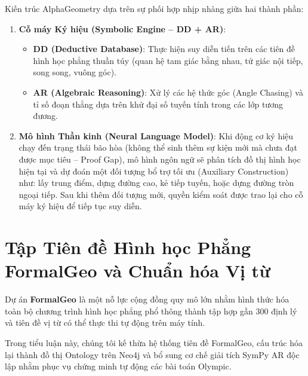 Kiến trúc AlphaGeometry dựa trên sự phối hợp nhịp nhàng giữa hai thành phần:
\begin{enumerate}
    \item \textbf{Cỗ máy Ký hiệu (Symbolic Engine -- DD + AR)}:
    \begin{itemize}
        \item \textbf{DD (Deductive Database)}: Thực hiện suy diễn tiến trên các tiên đề hình học phẳng thuần túy (quan hệ tam giác bằng nhau, tứ giác nội tiếp, song song, vuông góc).
        \item \textbf{AR (Algebraic Reasoning)}: Xử lý các hệ thức góc (Angle Chasing) và tỉ số đoạn thẳng dựa trên khử đại số tuyến tính trong các lớp tương đương.
    \end{itemize}
    \item \textbf{Mô hình Thần kinh (Neural Language Model)}:
    Khi động cơ ký hiệu chạy đến trạng thái bão hòa (không thể sinh thêm sự kiện mới mà chưa đạt được mục tiêu -- Proof Gap), mô hình ngôn ngữ sẽ phân tích đồ thị hình học hiện tại và dự đoán một đối tượng bổ trợ tối ưu (Auxiliary Construction) như: lấy trung điểm, dựng đường cao, kẻ tiếp tuyến, hoặc dựng đường tròn ngoại tiếp. Sau khi thêm đối tượng mới, quyền kiểm soát được trao lại cho cỗ máy ký hiệu để tiếp tục suy diễn.
\end{enumerate}

\section{Tập Tiên đề Hình học Phẳng FormalGeo và Chuẩn hóa Vị từ}
Dự án \textbf{FormalGeo} \cite{zhang2023formalgeo} là một nỗ lực cộng đồng quy mô lớn nhằm hình thức hóa toàn bộ chương trình hình học phẳng phổ thông thành tập hợp gần 300 định lý và tiên đề vị từ có thể thực thi tự động trên máy tính. 

Trong tiểu luận này, chúng tôi kế thừa hệ thống tiên đề FormalGeo, cấu trúc hóa lại thành đồ thị Ontology trên Neo4j và bổ sung cơ chế giải tích SymPy AR độc lập nhằm phục vụ chứng minh tự động các bài toán Olympic.
